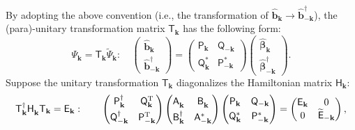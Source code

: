 \documentclass[aps, prx, nofootinbib, superscriptaddress]{revtex4-2}
\begin{document}
By adopting the above convention (i.e., the transformation of $\hat{\bm b}_{\mathbf{k}} \rightarrow \hat{\bm b}^{\dagger}_{-\mathbf{k}}$), the (para)-unitary transformation matrix $\mathsf{T}_{\mathbf{k}}$ has the following form: 
\begin{equation}
    \Psi_{\mathbf{k}} = \mathsf{T}_{\mathbf{k}} \widetilde{\Psi}_{\mathbf{k}}: \quad
    \begin{pmatrix}
        \hat{\bm b}_{\mathbf{k}} \\
        \hat{\bm b}_{-\mathbf{k}}^{\dagger}
    \end{pmatrix}
    =
    \begin{pmatrix}
        \mathsf{P}_{\mathbf{k}}       & \mathsf{Q}_{-\mathbf{k}} \\ 
        \mathsf{Q}_{\mathbf{k}}^{*}   & \mathsf{P}_{-\mathbf{k}}^{*}
    \end{pmatrix}
    \begin{pmatrix}
        \hat{\bm \beta}_{ \mathbf{k}} \\
        \hat{\bm \beta}_{-\mathbf{k}}^{\dagger}
    \end{pmatrix}.
\end{equation}
Suppose the unitary transformation $\mathsf{T}_{\mathbf{k}}$ diagonalizes the Hamiltonian matrix $\mathsf{H}_{\mathbf{k}}$:
\begin{equation}
    \mathsf{T}_{\mathbf{k}}^{\dagger} \mathsf{H}_{\mathbf{k}}^{\phantom \dagger} \mathsf{T}_{\mathbf{k}} = \mathsf{E}_{\mathbf{k}}: \qquad
        \begin{pmatrix}
        \mathsf{P}_{\mathbf{k}}^{\dagger}     & \mathsf{Q}_{  \mathbf{k}}^{\rm T} \\[0.3em] 
        \mathsf{Q}_{-\mathbf{k}}^{\dagger}    & \mathsf{P}_{- \mathbf{k}}^{\rm T}
    \end{pmatrix}
    \begin{pmatrix}
        \mathsf{A}^{\phantom \dagger}_{\mathbf{k}}      &   \mathsf{B}^{\phantom \dagger}_{\mathbf{k}}\\[0.3em] 
        \mathsf{B}^\dagger_{\mathbf{k}}                 &   \mathsf{A}^*_{-\mathbf{k}}
    \end{pmatrix}
    \begin{pmatrix}
        \mathsf{P}_{\mathbf{k}}       & \mathsf{Q}_{-\mathbf{k}} \\[0.3em] 
        \mathsf{Q}_{\mathbf{k}}^{*}   & \mathsf{P}_{-\mathbf{k}}^{*}
    \end{pmatrix}
    =
    \begin{pmatrix}
        \mathsf{E}_{\mathbf{k}} & 0 \\ 0 & \widetilde{\mathsf{E}}_{-\mathbf{k}}
    \end{pmatrix},
\end{equation}
\end{document}

